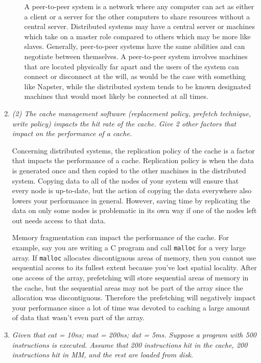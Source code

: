 \documentclass[letterpaper,11pt]{article}
\newcommand{\inlinecode}{\texttt}
\begin{document}
\begin{enumerate}
\begin{enumerate}
    A peer-to-peer system is a network where any computer can act as either a client or a server for the other computers to share resources without a central server.  Distributed systems may have a central server or machines which take on a master role compared to others which may be more like slaves.  Generally, peer-to-peer systems have the same abilities and can negotiate between themselves.  A peer-to-peer system involves machines that are located physically far apart and the users of the system can connect or disconnect at the will, as would be the case with something like Napster, while the distributed system tends to be known designated machines that would most likely be connected at all times.
  \end{enumerate}

  \item \emph{(2) The cache management software (replacement policy, prefetch technique, write policy) impacts the hit rate of the cache. Give 2 other factors that impact on the performance of a cache.}

  Concerning distributed systems, the replication policy of the cache is a factor that impacts the performance of a cache.  Replication policy is when the data is generated once and then copied to the other machines in the distributed system.  Copying data to all of the nodes of your system  will ensure that every node is up-to-date, but the action of copying the data everywhere also lowers your performance in general.  However, saving time by replicating the data on only some nodes is problematic in its own way if one of the nodes left out needs access to that data.
  
  Memory fragmentation can impact the performance of the cache.  For example, say you are writing a C program and call \inlinecode{malloc} for a very large array.  If \inlinecode{malloc} allocates discontiguous areas of memory, then you cannot use sequential access to its fullest extent because you've lost spatial locality.  After one access of the array, prefetching will store sequential areas of memory in the cache, but the sequential areas may not be part of the array since the allocation was discontiguous.  Therefore the prefetching will negatively impact your performance since a lot of time was devoted to caching a large amount of data that wasn't even part of the array.
  \item \emph{Given that cat = 10ns; mat = 200ns; dat = 5ms. Suppose a program with 500 instructions is executed. Assume that 200 instructions hit in the cache, 200 instructions hit in MM, and the rest are loaded from disk.}


\end{enumerate}
\end{document}
